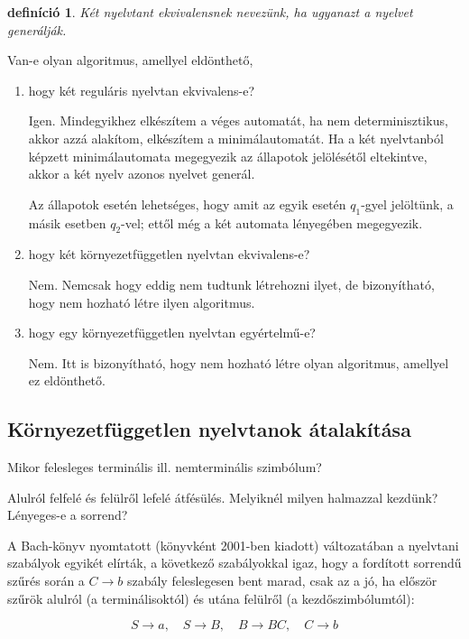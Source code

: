 \documentclass[a4paper]{article}
\newtheorem{definicio}{definíció}[section]
\begin{document}
\begin{definicio}
    \emph{Két nyelvtant ekvivalensnek} nevezünk, ha ugyanazt a nyelvet
    generálják. 
\end{definicio}

Van-e olyan algoritmus, amellyel eldönthető,
\begin{enumerate}
    \item hogy két reguláris nyelvtan ekvivalens-e?

        Igen. Mindegyikhez elkészítem a véges automatát, ha nem
        determinisztikus, akkor azzá alakítom, elkészítem a
        minimálautomatát. Ha a két nyelvtanból képzett minimálautomata
        megegyezik az állapotok jelölésétől eltekintve, akkor a két
        nyelv azonos nyelvet generál.

        Az állapotok esetén lehetséges, hogy amit az egyik esetén
        $q_1$-gyel jelöltünk, a másik esetben $q_2$-vel; ettől még a két
        automata lényegében megegyezik.

    \item  hogy két környezetfüggetlen nyelvtan ekvivalens-e?

        Nem. Nemcsak hogy eddig nem tudtunk létrehozni ilyet, de
        bizonyítható, hogy nem hozható létre ilyen algoritmus.

    \item hogy egy környezetfüggetlen nyelvtan egyértelmű-e?

        Nem. Itt is bizonyítható, hogy nem hozható létre olyan
        algoritmus, amellyel ez eldönthető.
\end{enumerate}


\subsection{Környezetfüggetlen nyelvtanok átalakítása}

Mikor felesleges terminális ill. nemterminális szimbólum?

Alulról felfelé és felülről lefelé átfésülés.
Melyiknél milyen halmazzal kezdünk? Lényeges-e a sorrend?

A Bach-könyv nyomtatott (könyvként 2001-ben kiadott) változatában a nyelvtani
szabályok egyikét elírták, a következő szabályokkal igaz, hogy a
fordított sorrendű szűrés során a $C\to b$ szabály feleslegesen
bent marad, csak az a jó, ha először szűrök alulról (a terminálisoktól)
és utána felülről (a kezdőszimbólumtól):

\[S\to a,\quad S\to B,\quad B\to BC,\quad C\to b\]
\end{document}
